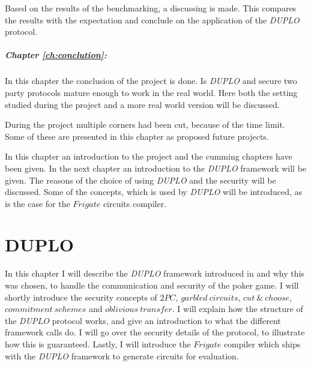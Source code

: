 \documentclass[twoside,11pt,openright]{report}
\newcommand{\DUPLO}{\textit{DUPLO} }
\begin{document}
Based on the results of the benchmarking, a discussing is made. This compares the results with the expectation and conclude on the application of the \DUPLO protocol.


\paragraph{Chapter \ref{ch:conclution}:}
In this chapter the conclusion of the project is done. Is \DUPLO and secure two party protocols mature enough to work in the real world. Here both the setting studied during the project and a more real world version will be discussed. 

During the project multiple corners had been cut, because of the time limit. Some of these are presented in this chapter as proposed future projects.

\bigskip

In this chapter an introduction to the project and the cumming chapters have been given. In the next chapter an introduction to the \DUPLO framework will be given. The reasons of the choice of using \DUPLO and the security will be discussed. Some of the concepts, which is used by \DUPLO will be introduced, as is the case for the $Frigate$ circuits compiler.


\chapter{DUPLO}
\label{ch:duplo}

In this chapter I will describe the \DUPLO framework introduced in \cite{duplo} and why this was chosen, to handle the communication and security of the poker game. I will shortly introduce the security concepts of $2PC$, $garbled~circuits$, $cut~\&~choose$, $commitment~schemes$ and $oblivious~transfer$. I will explain how the structure of the \DUPLO protocol works, and give an introduction to what the different framework calls do. I will go over the security details of the protocol, to illustrate how this is guaranteed. Lastly, I will introduce the $Frigate$ compiler which ships with the \DUPLO framework to generate circuits for evaluation.

\bigskip
\end{document}

